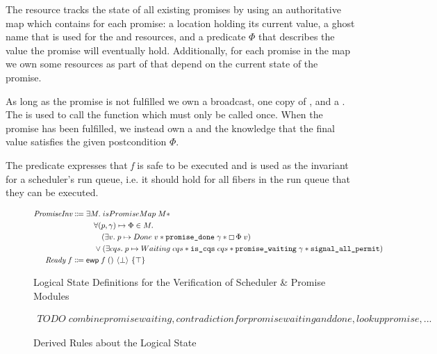 The resource \gsPInv{} tracks the state of all existing promises by using an authoritative map which contains for each promise: a location  holding its current value, a ghost name  that is used for the \gspwait{} and \gspdone{} resources, and a predicate \(Φ\) that describes the value the promise will eventually hold.
Additionally, for each promise in the map we own some resources as part of \gsPInv{} that depend on the current state of the promise.

As long as the promise is not fulfilled we own a broadcast, one copy of \gspwait{}, and a \gssignal{}.
The \gssignal{} is used to call the  function which must only be called once.
When the promise has been fulfilled, we instead own a \gspdone{} and the knowledge that the final value satisfies the given postcondition \(Φ\).

The \gsReady{} predicate expresses that \textit{f} is safe to be executed and is used as the invariant for a scheduler's run queue, i.e. it should hold for all fibers in the run queue that they can be executed.


\begin{figure}[ht]
  \begin{align*}
    \gsPInv{}  \Coloneqq\;     & \exists M.\; isPromiseMap\; M \ast                                                                                                                        \\
                               & \quad \forall (p, \gamma) \mapsto \Phi \in M.\;                                                                                                           \\
                               & \qquad (\exists v.\; p \mapsto Done\; v \ast \texttt{promise\_done}\; \gamma \ast \always \Phi\; v)                                                       \\
                               & \quad \vee (\exists cqs.\; p \mapsto Waiting\; cqs \ast \texttt{is\_cqs}\; cqs \ast \texttt{promise\_waiting}\; \gamma \ast \texttt{signal\_all\_permit}) \\
    \gsReady{}\; f \Coloneqq\; & \ewp{f\; ()}{\bot}{\top}
  \end{align*}
  \caption{Logical State Definitions for the Verification of Scheduler \& Promise Modules}
  \label{fig:logical-state-simpl}
\end{figure}

\begin{figure}[ht]
  \begin{align*}
    TODO\; combine promise waiting, contradiction for promise waiting and done, lookup promise, ...
  \end{align*}
  \caption{Derived Rules about the Logical State}
\end{figure}

